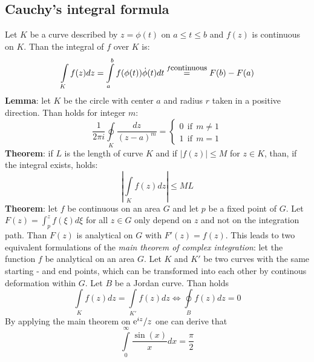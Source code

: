 \subsection{Cauchy's integral formula}
Let $K$ be a curve described by $z=\phi(t)$ on $a\leq t\leq b$ and $f(z)$
is continuous on $K$. Than the integral of $f$ over $K$ is:
\[
\int\limits_Kf(z)dz=\int\limits_a^bf(\phi(t))\dot{\phi}(t)dt
\stackrel{f\mbox{\small continuous}}{=}F(b)-F(a)
\]
{\bf Lemma}: let $K$ be the circle with center $a$ and radius $r$ taken in a
positive direction. Than holds for integer $m$:
\[
\frac{1}{2\pi i}\oint\limits_K \frac{dz}{(z-a)^m}=\left\{
\begin{array}{l}
0~~\mbox{if}~~m\neq1\\
1~~\mbox{if}~~m=1
\end{array}\right.
\]
{\bf Theorem}: if $L$ is the length of curve $K$ and if $|f(z)|\leq M$ for
$z\in K$, than, if the integral exists, holds:
\[
\left|\int\limits_K f(z)dz\right|\leq ML
\]
{\bf Theorem}: let $f$ be continuous on an area $G$ and let $p$ be a fixed
point of $G$. Let $F(z)=\int_p^zf(\xi)d\xi$ for all $z\in G$ only depend on
$z$ and not on the integration path. Than $F(z)$ is analytical on $G$ with
$F'(z)=f(z)$.
\npar
This leads to two equivalent formulations of the {\it main theorem of
complex integration}: let the function $f$ be analytical on an area $G$. Let
$K$ and $K'$ be two curves with the same starting - and end points, which can be
transformed into each other by continous deformation within $G$. Let $B$ be
a Jordan curve. Than holds
\[
\int\limits_Kf(z)dz=\int\limits_{K'}f(z)dz\Leftrightarrow\oint\limits_Bf(z)dz=0
\]
By applying the main theorem on ${\rm e}^{iz}/z$ one can derive that
\[
\int\limits_0^\infty\frac{\sin(x)}{x}dx=\frac{\pi}{2}
\]

